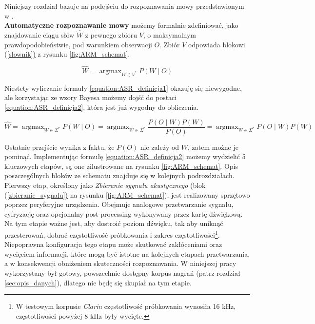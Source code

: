 \documentclass[shortabstract, mgr]{iithesis}
\DeclareMathOperator*{\argmax}{\arg\max}   %
\newcommand{\refBlock}[1]{(\hyperref[#1]{\ref*{#1})}
}
\begin{document}
	Niniejszy rozdział bazuje na podejściu do rozpoznawania mowy przedstawionym w \cite{book1}. \\
	\textbf{Automatyczne rozpoznawanie mowy} możemy formalnie zdefiniować, jako znajdowanie ciągu słów $\hat{W}$ z pewnego zbioru $V$, o maksymalnym prawdopodobieństwie, pod warunkiem obserwacji $O$. Zbiór $V$ odpowiada blokowi \refBlock{slownik} z rysunku \ref{fig:ARM_schemat}.
	
	\begin{equation}
		\hat{W}=\argmax_{W \in V^{*}}{P(W \mid O)}
		\label{equation:ASR_definicja1}
	\end{equation}
	
	Niestety wyliczanie formuły \ref{equation:ASR_definicja1} okazuję się niewygodne, ale korzystając ze wzory Bayesa możemy dojść do postaci \ref{equation:ASR_definicja2}, która jest już wygodny do obliczenia.
	
	\begin{equation}
		\hat{W}=\argmax_{W \in \Sigma^{*}}{P(W \mid O)} = \argmax_{W \in \Sigma^{*}}{\frac{P(O \mid W)P(W)}{P(O)}} = \argmax_{W \in \Sigma^{*}}{P(O \mid W)P(W)}
		\label{equation:ASR_definicja2}
	\end{equation}
	
	Ostatnie przejście wynika z faktu, że $P(O)$ nie zależy od $W$, zatem możne je pominąć.
	Implementując formułę \ref{equation:ASR_definicja2} możemy wydzielić 5 kluczowych etapów, są one zilustrowane na rysunku \ref{fig:ARM_schemat}. Opis poszczególnych bloków ze schematu znajduje się w kolejnych podrozdziałach.
	\\
	Pierwszy etap, określony jako \textit{Zbieranie sygnału akustycznego} (blok \refBlock{zbieranie_sygnalu} na rysunku \ref{fig:ARM_schemat}), jest realizowany sprzętowo poprzez peryferyjne urządzenia. Obejmuje analogowe przetwarzanie sygnału, cyfryzację oraz opcjonalny post-processing wykonywany przez kartę dźwiękową. Na tym etapie ważne jest, aby dostroić poziom dźwięku, tak aby uniknąć przesterowań, dobrać częstotliwość próbkowania i zakres częstotliwości\footnote{W testowym korpusie \textit{Clarin} częstotliwość próbkowania wynosiła 16 kHz, częstotliwości powyżej 8 kHz były wycięte.}. Niepoprawna konfiguracja tego etapu może skutkować zakłóceniami oraz wycięciem informacji, które mogą być istotne na kolejnych etapach przetwarzania, a w konsekwencji obniżeniem skuteczności rozpoznawania. W niniejszej pracy wykorzystany był gotowy, powszechnie dostępny korpus nagrań (patrz rozdział \ref{sec:opis_danych}), dlatego nie będę się skupiał na tym etapie.
\end{document}
